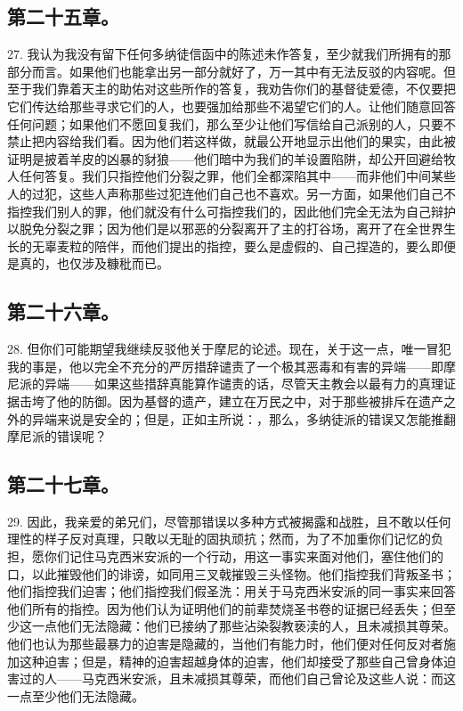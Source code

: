 
\subsection{第二十五章。}

27. 我认为我没有留下任何多纳徒信函中的陈述未作答复，至少就我们所拥有的那部分而言。如果他们也能拿出另一部分就好了，万一其中有无法反驳的内容呢。但至于我们靠着天主的助佑对这些所作的答复，我劝告你们的基督徒爱德，不仅要把它们传达给那些寻求它们的人，也要强加给那些不渴望它们的人。让他们随意回答任何问题；如果他们不愿回复我们，那么至少让他们写信给自己派别的人，只要不禁止把内容给我们看。因为他们若这样做，就最公开地显示出他们的果实，由此被证明是披着羊皮的凶暴的豺狼——他们暗中为我们的羊设置陷阱，却公开回避给牧人任何答复。我们只指控他们分裂之罪，他们全都深陷其中——而非他们中间某些人的过犯，这些人声称那些过犯连他们自己也不喜欢。另一方面，如果他们自己不指控我们别人的罪，他们就没有什么可指控我们的，因此他们完全无法为自己辩护以脱免分裂之罪；因为他们是以邪恶的分裂离开了主的打谷场，离开了在全世界生长的无辜麦粒的陪伴，而他们提出的指控，要么是虚假的、自己捏造的，要么即便是真的，也仅涉及糠秕而已。\par


\subsection{第二十六章。}

28. 但你们可能期望我继续反驳他关于摩尼的论述。现在，关于这一点，唯一冒犯我的事是，他以完全不充分的严厉措辞谴责了一个极其恶毒和有害的异端——即摩尼派的异端——如果这些措辞真能算作谴责的话，尽管天主教会以最有力的真理证据击垮了他的防御。因为基督的遗产，建立在万民之中，对于那些被排斥在遗产之外的异端来说是安全的；但是，正如主所说：，那么，多纳徒派的错误又怎能推翻摩尼派的错误呢？\par


\subsection{第二十七章。}

29. 因此，我亲爱的弟兄们，尽管那错误以多种方式被揭露和战胜，且不敢以任何理性的样子反对真理，只敢以无耻的固执顽抗；然而，为了不加重你们记忆的负担，愿你们记住马克西米安派的一个行动，用这一事实来面对他们，塞住他们的口，以此摧毁他们的诽谤，如同用三叉戟摧毁三头怪物。他们指控我们背叛圣书；他们指控我们迫害；他们指控我们假圣洗：用关于马克西米安派的同一事实来回答他们所有的指控。因为他们认为证明他们的前辈焚烧圣书卷的证据已经丢失；但至少这一点他们无法隐藏：他们已接纳了那些沾染裂教亵渎的人，且未减损其尊荣。他们也认为那些最暴力的迫害是隐藏的，当他们有能力时，他们便对任何反对者施加这种迫害；但是，精神的迫害超越身体的迫害，他们却接受了那些自己曾身体迫害过的人——马克西米安派，且未减损其尊荣，而他们自己曾论及这些人说：而这一点至少他们无法隐藏。\par

